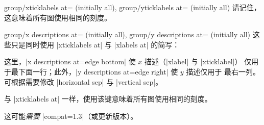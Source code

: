 {\begin{pgfplotskeylist}{%
    group/xticklabels at= (initially all),
    group/yticklabels at= (initially all)%
}
    请记住，这意味着所有图使用相同的刻度。
\end{pgfplotskeylist}

\begin{pgfplotskeylist}{%
    group/x descriptions at= (initially all),
    group/y descriptions at= (initially all)%
}
    这些只是同时使用 |xticklabels at| 与 |xlabels at| 的简写：
\begin{codeexample}[]
\end{codeexample}

    这里，|x descriptions at=edge bottom| 使 $x$ 描述（|xlabel| 与 |xticklabel|）
    仅用于最下面一行；此外，|y descriptions at=edge right| 使 $y$ 描述仅用于
    最右一列。可根据需要修改 |horizontal sep| 与 |vertical sep|。

    与 |xticklabels at| 一样，使用该键意味着所有图使用相同的刻度。

    这可能\emph{需要} |compat=1.3|（或更新版本）。
\end{pgfplotskeylist}

}

